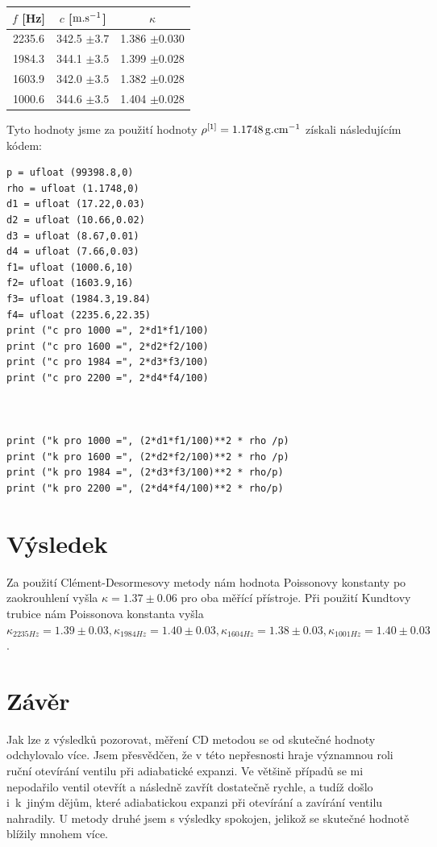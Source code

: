 \documentclass[czech,11pt,a4paper]{article}
\begin{document}
\begin{center}
	\begin{tabular}{|c|c|c|}
	\hline
	$f$ [Hz] & $c$ [$\rm m.s^{-1}$]& $\kappa$\\
	\hline
	2235.6 & 342.5 $\pm 3.7$& 1.386 $\pm 0.030$\\
	\hline
	1984.3 & 344.1 $\pm 3.5$& 1.399 $\pm 0.028$\\
	\hline
	1603.9 & 342.0 $\pm 3.5$&  1.382 $\pm 0.028$\\
	\hline
	1000.6 & 344.6 $\pm 3.5$& 1.404 $\pm 0.028$\\
	\hline
\end{tabular}
\end{center}
Tyto hodnoty jsme za použití hodnoty $\rho^{[1]} = 1.1748\,\rm g.cm^{-1} $ získali následujícím kódem:
\begin{verbatim}
p = ufloat (99398.8,0)
rho = ufloat (1.1748,0)
d1 = ufloat (17.22,0.03)
d2 = ufloat (10.66,0.02)
d3 = ufloat (8.67,0.01)
d4 = ufloat (7.66,0.03)
f1= ufloat (1000.6,10)
f2= ufloat (1603.9,16)
f3= ufloat (1984.3,19.84)
f4= ufloat (2235.6,22.35)
print ("c pro 1000 =", 2*d1*f1/100)
print ("c pro 1600 =", 2*d2*f2/100)
print ("c pro 1984 =", 2*d3*f3/100)
print ("c pro 2200 =", 2*d4*f4/100)



print ("k pro 1000 =", (2*d1*f1/100)**2 * rho /p)
print ("k pro 1600 =", (2*d2*f2/100)**2 * rho /p)
print ("k pro 1984 =", (2*d3*f3/100)**2 * rho/p)
print ("k pro 2200 =", (2*d4*f4/100)**2 * rho/p)
\end{verbatim}



	


	
	
	\section{Výsledek}
	
	Za použití Clément-Desormesovy metody nám hodnota Poissonovy konstanty po zaokrouhlení vyšla $\kappa = 1.37 \pm 0.06$ pro oba měřící přístroje. Při použití Kundtovy trubice nám Poissonova konstanta vyšla $\kappa_ {2235Hz}= 1.39 \pm 0.03, \kappa_ {1984Hz}= 1.40 \pm 0.03, \kappa_ {1604Hz}= 1.38 \pm 0.03, \kappa_ {1001Hz}= 1.40 \pm 0.03$.
	
	\section{Závěr}
	Jak lze z výsledků pozorovat, měření CD metodou se od skutečné hodnoty odchylovalo více. Jsem přesvědčen, že v této nepřesnosti hraje významnou roli ruční otevírání ventilu při adiabatické expanzi. Ve většině případů se mi nepodařilo ventil otevřít a následně zavřít dostatečně rychle, a tudíž došlo i~k~jiným dějům, které adiabatickou expanzi při otevírání a zavírání ventilu nahradily. U metody druhé jsem s výsledky spokojen, jelikož se skutečné hodnotě blížily mnohem více.
\end{document}
